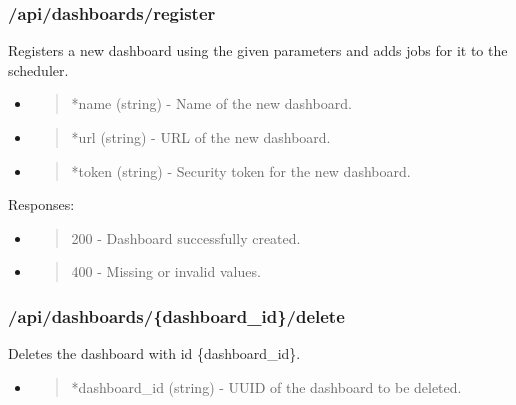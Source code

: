 \hypertarget{apidashboardsregister}{%
\subsubsection{/api/dashboards/register}\label{apidashboardsregister}}

Registers a new dashboard using the given parameters and adds jobs for
it to the scheduler.

\begin{itemize}
\item
  \begin{quote}
  *name (string) - Name of the new dashboard.
  \end{quote}
\item
  \begin{quote}
  *url (string) - URL of the new dashboard.
  \end{quote}
\item
  \begin{quote}
  *token (string) - Security token for the new dashboard.
  \end{quote}
\end{itemize}

Responses:

\begin{itemize}
\item
  \begin{quote}
  200 - Dashboard successfully created.
  \end{quote}
\item
  \begin{quote}
  400 - Missing or invalid values.
  \end{quote}
\end{itemize}

\hypertarget{apidashboardsdashboard_iddelete}{%
\subsubsection{/api/dashboards/\{dashboard\_id\}/delete}\label{apidashboardsdashboard_iddelete}}

Deletes the dashboard with id \{dashboard\_id\}.

\begin{itemize}
\item
  \begin{quote}
  *dashboard\_id (string) - UUID of the dashboard to be deleted.
  \end{quote}
\end{itemize}

